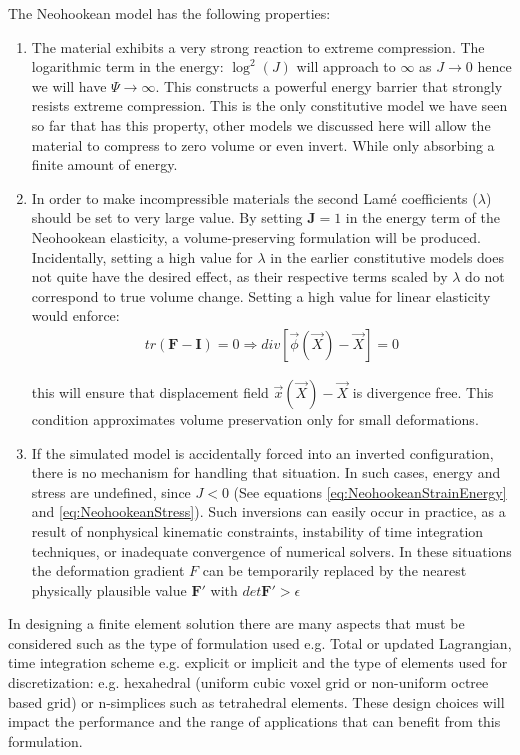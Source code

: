 The Neohookean model has the following properties:

\begin{enumerate}
 \item The material exhibits a very strong reaction to extreme compression. The logarithmic term in the energy: $\log^2(J)$ will approach 
 to $\infty$ as $J \rightarrow 0$ hence we will have $\Psi \rightarrow \infty$. This constructs a powerful energy barrier that strongly
 resists extreme compression. This is the only constitutive model we have seen so far that has this property, other models we discussed here
 will allow the material to compress to zero volume or even invert. While only absorbing a finite amount of energy.
 
 \item In order to make incompressible materials the second Lam\'e coefficients ($\lambda$) should be set to very large value. By setting 
 $\boldsymbol{J}=1$ in the energy term of the Neohookean elasticity, a volume-preserving formulation will be produced. Incidentally, setting a
 high value for $\lambda$ in the earlier constitutive models does not quite have the desired effect, as their respective terms scaled by $\lambda$
 do not correspond to true volume change. Setting a high value for linear elasticity would enforce:
\begin{gather*}
  tr(\boldsymbol{F}-\boldsymbol{I})=0 \Rightarrow div\left[\vec{\phi}(\vec{X})-\vec{X}\right] = 0
\end{gather*}

this will ensure that displacement field $\vec{x}(\vec{X})-\vec{X}$ is divergence free. This condition approximates volume preservation only
for small deformations.

\item If the simulated model is accidentally forced into an inverted configuration, there is no mechanism for handling that situation.  
In such cases, energy and stress are undefined, since $J <0$ (See equations \ref{eq:NeohookeanStrainEnergy} and \ref{eq:NeohookeanStress}).
Such inversions can easily occur in practice, as a result of nonphysical kinematic constraints, instability of time integration techniques,
or inadequate convergence of numerical solvers. In these situations the deformation gradient $F$ can be temporarily replaced by the nearest
physically plausible value $\boldsymbol{F'}$ with $det\boldsymbol{F'} > \epsilon$
\end{enumerate}

In designing a finite element solution there are many aspects that must be considered such as the type of formulation used e.g.
Total or updated Lagrangian, time integration scheme e.g. explicit or implicit and the type of elements used for discretization:
e.g. hexahedral (uniform cubic voxel grid or non-uniform octree based grid) or n-simplices such as tetrahedral elements. 
These design choices will impact the performance and the range of applications that can benefit from this formulation.

\setlength{\unitlength}{\savedunitlength}
